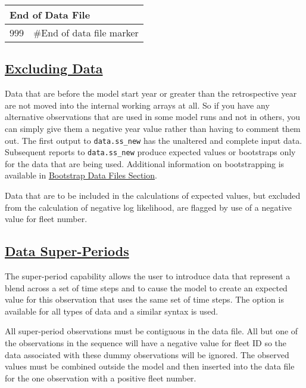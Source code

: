 \begin{center}
	\begin{tabular}{p{2cm} p{14cm}} \\
		\multicolumn{2}{l}{End of Data File} \\
		\hline
		999 & \#End of data file marker \Tstrut\Bstrut\\
		\hline
	\end{tabular}
	\leavevmode\tagmcend\tagstructend\par
\end{center}

\hypertarget{ExcludingData}{}
\subsection[Excluding Data]{\protect\hyperlink{ExcludingData}{Excluding Data}}
Data that are before the model start year or greater than the retrospective year are not moved into the internal working arrays at all. So if you have any alternative observations that are used in some model runs and not in others, you can simply give them a negative year value rather than having to comment them out. The first output to \texttt{data.ss\_new} has the unaltered and complete input data. Subsequent reports to \texttt{data.ss\_new} produce expected values or bootstraps only for the data that are being used. Additional information on bootstrapping is available in \hyperlink{bootstrap}{Bootstrap Data Files Section}. 

Data that are to be included in the calculations of expected values, but excluded from the calculation of negative log likelihood, are flagged by use of a negative value for fleet number.

\hypertarget{SuperPeriod}{}
\subsection[Data Super-Periods]{\protect\hyperlink{SuperPeriod}{Data Super-Periods}}
The super-period capability allows the user to introduce data that represent a blend across a set of time steps and to cause the model to create an expected value for this observation that uses the same set of time steps. The option is available for all types of data and a similar syntax is used. 

All super-period observations must be contiguous in the data file. All but one of the observations in the sequence will have a negative value for fleet ID so the data associated with these dummy observations will be ignored. The observed values must be combined outside the model and then inserted into the data file for the one observation with a positive fleet number.

